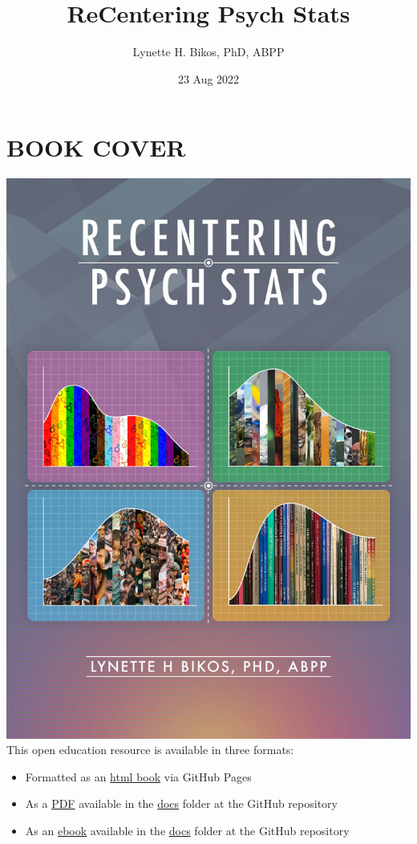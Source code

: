 \documentclass[
  11pt,
]{book}
\title{ReCentering Psych Stats}
\author{Lynette H. Bikos, PhD, ABPP}
\date{23 Aug 2022}
\providecommand{\tightlist}{%
  \setlength{\itemsep}{0pt}\setlength{\parskip}{0pt}}
\begin{document}
\maketitle

{
\hypersetup{linkcolor=}
\setcounter{tocdepth}{3}
\tableofcontents
}
\hypertarget{book-cover}{%
\chapter*{BOOK COVER}\label{book-cover}}

\includegraphics{images/ReCenterPsychStats-bookcover2.jpg}
This open education resource is available in three formats:

\begin{itemize}
\tightlist
\item
  Formatted as an \href{https://lhbikos.github.io/ReCenterPsychStats/}{html book} via GitHub Pages
\item
  As a \href{https://github.com/lhbikos/ReCenterPsychStats/blob/main/docs/ReCenterPsychStats.pdf}{PDF} available in the \href{https://github.com/lhbikos/ReCenterPsychStats/tree/main/docs}{docs} folder at the GitHub repository
\item
  As an \href{https://github.com/lhbikos/ReCenterPsychStats/blob/main/docs/ReCenterPsychStats.epub}{ebook} available in the \href{https://github.com/lhbikos/ReCenterPsychStats/tree/main/docs}{docs} folder at the GitHub repository
\end{itemize}
\end{document}
